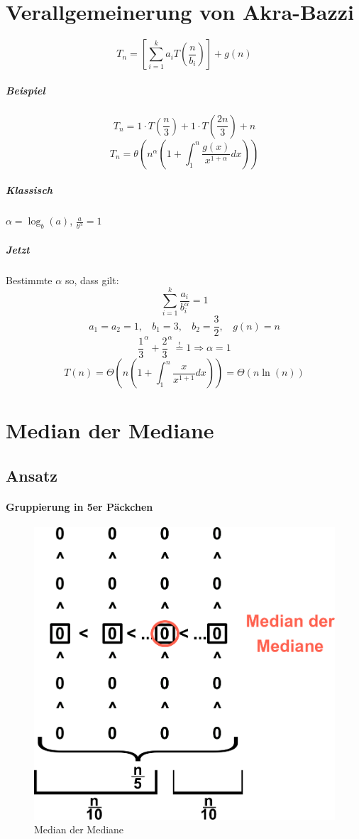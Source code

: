 

\chapter{Verallgemeinerung von Akra-Bazzi}

\[T_n = \left[\sum_{i=1}^k a_i T(\frac{n}{b_i}) \right] + g(n) \]
\paragraph{Beispiel}
\[T_n = 1\cdot T\left(\frac{n}{3}\right)+1\cdot T\left(\frac{2n}{3}\right) + n \]
\[T_n = \theta\left(n^{\alpha}\left(1+\int_1^n\frac{g\left(x\right)}{x^{1+\alpha}} dx\right)\right)  \]


\paragraph{Klassisch} $\alpha = \log_b(a)$, $\frac{a}{b^{\alpha}} = 1$
\paragraph{Jetzt} Bestimmte $\alpha$ so, dass gilt:
\[\sum_{i=1}^k \frac{a_i}{b_i^{\alpha}} = 1 \]
\[a_1 = a_2 = 1, ~~~~ b_1 = 3, ~~~~ b_2 = \frac{3}{2}, ~~~~ g(n) = n \]
 \[\frac{1}{3}^{\alpha} + \frac{2}{3}^{\alpha} \overset{!}{=} 1 \Rightarrow \alpha = 1 \]
\[T(n) = \Theta \left(n \left(1+\int_1^n \frac{x}{x^{1+1}} dx\right) \right) = \Theta(n\ln(n)) \]


\chapter{Median der Mediane}
\section{Ansatz} %
\subsubsection*{Gruppierung in 5er Päckchen}
\begin{figure}
\vspace{-40pt}
\centering
\includegraphics[width=0.6\linewidth]{08/Grafik/img1.png}
\caption{Median der Mediane}
\end{figure}

